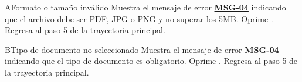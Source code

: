 \begin{UCtrayectoriaA}{A}{Formato o tamaño inválido}
	\UCpaso Muestra el mensaje de error \hyperlink{mMSG04}{\bf MSG-04} indicando que el archivo debe ser PDF, JPG o PNG y no superar los 5MB.
	\UCpaso[\UCactor] Oprime .
	\UCpaso Regresa al paso 5 de la trayectoria principal.
\end{UCtrayectoriaA}

\begin{UCtrayectoriaA}{B}{Tipo de documento no seleccionado}
	\UCpaso Muestra el mensaje de error \hyperlink{mMSG04}{\bf MSG-04} indicando que el tipo de documento es obligatorio.
	\UCpaso[\UCactor] Oprime .
	\UCpaso Regresa al paso 5 de la trayectoria principal.
\end{UCtrayectoriaA}

